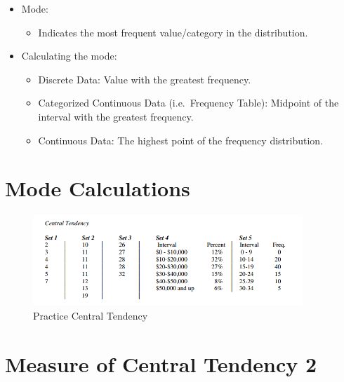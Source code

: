 \documentclass[12pt]{article}
\begin{document}
\begin{itemize}
\itemsep1pt\parskip0pt
\item
  Mode:

  \begin{itemize}
  \itemsep1pt\parskip0pt
  \item
    Indicates the most frequent value/category in the distribution.
  \end{itemize}
\item
  Calculating the mode:

  \begin{itemize}
  \itemsep1pt\parskip0pt
  \item
    Discrete Data: Value with the greatest frequency.
  \item
    Categorized Continuous Data (i.e.~Frequency Table): Midpoint of the
    interval with the greatest frequency.
  \item
    Continuous Data: The highest point of the frequency distribution.
  \end{itemize}
\end{itemize}

\section{Mode Calculations}\label{mode-calculations}

\begin{figure}[H]
\centering
\includegraphics[width=4in]{PracticeCentralTend.png}
\caption{Practice Central Tendency}
\end{figure}

\section{Measure of Central Tendency
2}\label{measure-of-central-tendency-2}
\end{document}
